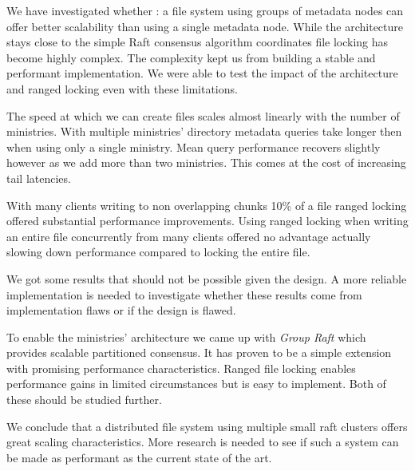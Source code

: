 We have investigated whether \name{}: a file system using groups of metadata nodes can offer better scalability than using a single metadata node. While the architecture stays close to the simple Raft consensus algorithm coordinates file locking has become highly complex. The complexity kept us from building a stable and performant implementation. We were able to test the impact of the architecture and ranged locking even with these limitations.

The speed at which we can create files scales almost linearly with the number of ministries. With multiple ministries' directory metadata queries take longer then when using only a single ministry. Mean query performance recovers slightly however as we add more than two ministries. This comes at the cost of increasing tail latencies.

With many clients writing to non overlapping chunks 10\% of a file ranged locking offered substantial performance improvements. Using ranged locking when writing an entire file concurrently from many clients offered no advantage actually slowing down performance compared to locking the entire file.

We got some results that should not be possible given the design. A more reliable implementation is needed to investigate whether these results come from implementation flaws or if the design is flawed. 

To enable the ministries' architecture we came up with \textit{Group Raft} which provides scalable partitioned consensus. It has proven to be a simple extension with promising performance characteristics. Ranged file locking enables performance gains in limited circumstances but is easy to implement. Both of these should be studied further. 

We conclude that a distributed file system using multiple small raft clusters offers great scaling characteristics. More research is needed to see if such a system can be made as performant as the current state of the art.
